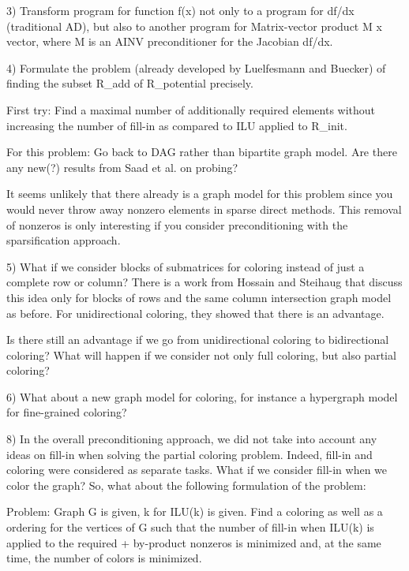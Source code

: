 \documentclass[12pt, oneside]{book}
\begin{document}
3) Transform program for function f(x) not only to a program for
df/dx (traditional AD), but also to another program for
Matrix-vector product M x vector, where M is an AINV preconditioner
for the Jacobian df/dx.

4) Formulate the problem (already developed by Luelfesmann and
Buecker) of finding the subset R\_add of R\_potential precisely.

First try: Find a maximal number of additionally required elements
without increasing the number of fill-in as compared to ILU applied
to R\_init.

For this problem: Go back to DAG rather than bipartite graph model.
Are there any new(?) results from Saad et al. on probing?

It seems unlikely that there already is a graph model for this
problem since you would never throw away nonzero elements in sparse
direct methods. This removal of nonzeros is only interesting if you
consider preconditioning with the sparsification approach.

5) What if we consider blocks of submatrices for coloring instead
of just a complete row or column? There is a work from Hossain and
Steihaug that discuss this idea only for blocks of rows and the
same column intersection graph model as before. For unidirectional
coloring, they showed that there is an advantage.

Is there still an advantage if we go from unidirectional coloring
to bidirectional coloring? What will happen if we consider not only
full coloring, but also partial coloring?

6) What about a new graph model for coloring, for instance a
hypergraph model for fine-grained coloring?

8) In the overall preconditioning approach, we did not take into
account any ideas on fill-in when solving the partial coloring
problem. Indeed, fill-in and coloring were considered as separate
tasks. What if we consider fill-in when we color the graph? So,
what about the following formulation of the problem:

Problem: Graph G is given, k for ILU(k) is given. Find a coloring
as well as a ordering for the vertices of G such that the number of
fill-in when ILU(k) is applied to the required + by-product
nonzeros is minimized and, at the same time, the number of colors
is minimized.
\label{conc}


\end{document}
